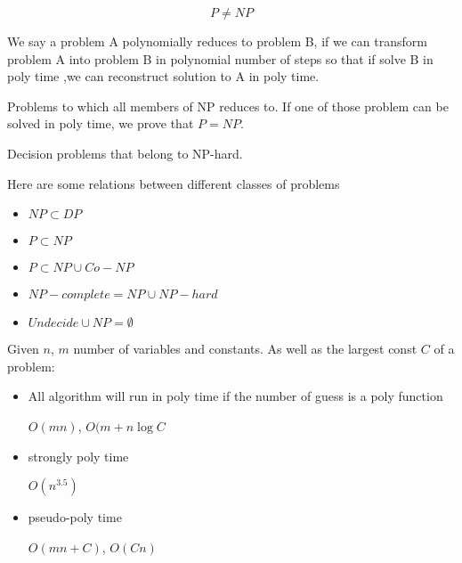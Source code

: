 			\begin{conjecture}
				\begin{equation}
					P \ne NP
				\end{equation}
			\end{conjecture}

			\begin{definition}
				We say a problem A polynomially reduces to problem B, if we can transform problem A into problem B in polynomial number of steps so that if solve B in poly time ,we can reconstruct solution to A in poly time.
			\end{definition}

			\begin{definition}[NP-hard]
				Problems to which all members of NP reduces to. If one of those problem can be solved in poly time, we prove that $P=NP$.
			\end{definition}

			\begin{definition}[NPC]
				Decision problems that belong to NP-hard. 
			\end{definition}

			Here are some relations between different classes of problems
			\begin{itemize}
				\item $NP \subset DP$
				\item $P \subset NP$
				\item $P \subset NP \cup Co-NP$
				\item $NP-complete = NP \cup NP-hard$
				\item $Undecide \cup NP = \emptyset$
			\end{itemize}

			Given $n$, $m$ number of variables and constants. As well as the largest const $C$ of a problem:
			\begin{itemize}
				\item All algorithm will run in poly time if the number of guess is a poly function
				\begin{example}
					$O(mn)$, $O(m + n\log C$
				\end{example}
				\item strongly poly time
				\begin{example}
					$O(n^3.5)$
				\end{example}
				\item pseudo-poly time
				\begin{example}
					$O(mn + C)$, $O(Cn)$
				\end{example}
			\end{itemize}

